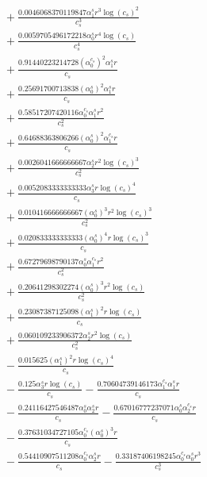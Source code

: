 \documentclass[10pt]{article}
\begin{document}
\begin{align*}
&{}  + \frac{0.0046068370119847 \alpha_{1}^s r^{3} \log{\left(c_{s} \right)}^{2}}{c_{s}^{3}} \\
&{}  + \frac{0.0059705496172218 \alpha_{0}^s r^{4} \log{\left(c_{s} \right)}}{c_{s}^{4}} \\
&{}  + \frac{0.91440223214728 \left(\alpha_{0}^{c_s}\right)^{2} \alpha_{1}^s r}{c_{s}} \\
&{}  + \frac{0.25691700713838 \left(\alpha_{0}^s\right)^{2} \alpha_{1}^s r}{c_{s}} \\
&{}  + \frac{0.58517207420116 \alpha_{0}^{c_s} \alpha_{1}^s r^{2}}{c_{s}^{2}} \\
&{}  + \frac{0.64688363806266 \left(\alpha_{0}^s\right)^{2} \alpha_{1}^{c_s} r}{c_{s}} \\
&{}  + \frac{0.0026041666666667 \alpha_{2}^s r^{2} \log{\left(c_{s} \right)}^{3}}{c_{s}^{2}} \\
&{}  + \frac{0.0052083333333333 \alpha_{3}^s r \log{\left(c_{s} \right)}^{4}}{c_{s}} \\
&{}  + \frac{0.010416666666667 \left(\alpha_{0}^s\right)^{3} r^{2} \log{\left(c_{s} \right)}^{3}}{c_{s}^{2}} \\
&{}  + \frac{0.020833333333333 \left(\alpha_{0}^s\right)^{4} r \log{\left(c_{s} \right)}^{3}}{c_{s}} \\
&{}  + \frac{0.67279698790137 \alpha_{0}^s \alpha_{1}^{c_s} r^{2}}{c_{s}^{2}} \\
&{}  + \frac{0.20641298302274 \left(\alpha_{0}^s\right)^{3} r^{2} \log{\left(c_{s} \right)}}{c_{s}^{2}} \\
&{}  + \frac{0.23087387125098 \left(\alpha_{1}^s\right)^{2} r \log{\left(c_{s} \right)}}{c_{s}} \\
&{}  + \frac{0.060109233906372 \alpha_{2}^s r^{2} \log{\left(c_{s} \right)}}{c_{s}^{2}} \\
&{}  - \frac{0.015625 \left(\alpha_{1}^s\right)^{2} r \log{\left(c_{s} \right)}^{4}}{c_{s}} \\
&{}  - \frac{0.125 \alpha_{3}^s r \log{\left(c_{s} \right)}}{c_{s}} - \frac{0.70604739146173 \alpha_{1}^{c_s} \alpha_{1}^s r}{c_{s}} \\
&{}  - \frac{0.24116427546487 \alpha_{0}^s \alpha_{2}^s r}{c_{s}} - \frac{0.67016777237071 \alpha_{0}^s \alpha_{2}^{c_s} r}{c_{s}} \\
&{}  - \frac{0.37631034727105 \alpha_{0}^{c_s} \left(\alpha_{0}^s\right)^{3} r}{c_{s}} \\
&{}  - \frac{0.54410907511208 \alpha_{0}^{c_s} \alpha_{2}^s r}{c_{s}} - \frac{0.33187406198245 \alpha_{0}^{c_s} \alpha_{0}^s r^{3}}{c_{s}^{3}} \\

\end{align*}
\end{document}

